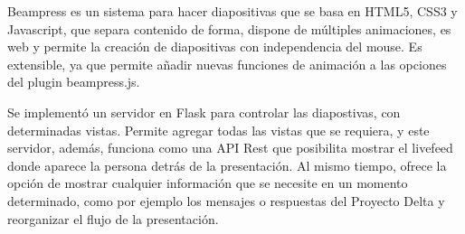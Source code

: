 
\begin{conclusions}

	Beampress es un sistema para hacer diapositivas que se basa en HTML5, CSS3 y Javascript, que separa contenido de forma, dispone de múltiples animaciones, es web y permite la creación de diapositivas con independencia del mouse. Es extensible, ya que permite añadir nuevas funciones de animación a las opciones del plugin beampress.js.

	Se implementó un servidor en Flask para controlar las diapostivas, con determinadas vistas. Permite agregar todas las vistas que se requiera, y este servidor, además, funciona como una API Rest que posibilita mostrar el livefeed donde aparece la persona detrás de la presentación. Al mismo tiempo, ofrece la opción de mostrar cualquier información que se necesite en un momento determinado, como por ejemplo los mensajes o respuestas del Proyecto Delta y reorganizar el flujo de la presentación.

\end{conclusions}
